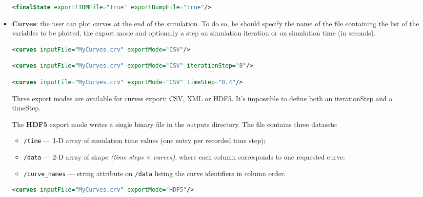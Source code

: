 \documentclass[a4paper, 12pt]{report}
\begin{document}
\begin{itemize}
\begin{lstlisting}[language=XML, morekeywords={finalState},numbers=none]
<finalState exportIIDMFile="true" exportDumpFile="true"/>
\end{lstlisting}

\item \textbf{Curves}: the user can plot curves at the end of the simulation. To do so, he should specify the name of the file containing the list of the variables to be plotted, the export mode and optionally a step on simulation iteration or on simulation time (in seconds).

\begin{lstlisting}[language=XML, morekeywords={curves},numbers=none]
<curves inputFile="MyCurves.crv" exportMode="CSV"/>
\end{lstlisting}

\begin{lstlisting}[language=XML, morekeywords={curves},numbers=none]
<curves inputFile="MyCurves.crv" exportMode="CSV" iterationStep="8"/>
\end{lstlisting}

\begin{lstlisting}[language=XML, morekeywords={curves},numbers=none]
<curves inputFile="MyCurves.crv" exportMode="CSV" timeStep="0.4"/>
\end{lstlisting}

Three export modes are available for curves export: CSV, XML or HDF5.
It's impossible to define both an iterationStep and a timeStep.

The \textbf{HDF5} export mode writes a single binary file  in the outputs directory.
The file contains three datasets:
\begin{itemize}
  \item \texttt{/time} — 1-D array of simulation time values (one entry per recorded time step);
  \item \texttt{/data} — 2-D array of shape \textit{(time steps} $\times$ \textit{curves)}, where each column corresponds to one requested curve;
  \item \texttt{/curve\_names} — string attribute on \texttt{/data} listing the curve identifiers in column order.
\end{itemize}

\begin{lstlisting}[language=XML, morekeywords={curves},numbers=none]
<curves inputFile="MyCurves.crv" exportMode="HDF5"/>
\end{lstlisting}


\end{itemize}
\end{document}
